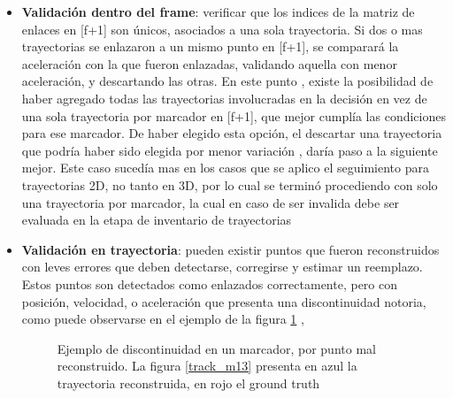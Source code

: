 \begin{itemize}
\item \textbf{Validación dentro del frame}: verificar que los indices de la matriz de enlaces en [f+1] son únicos, asociados a una sola trayectoria. Si dos o mas trayectorias se enlazaron a un mismo punto en [f+1], se comparará la aceleración con la que fueron enlazadas, validando aquella con menor aceleración, y descartando las otras. En este punto , existe la posibilidad de haber agregado todas las trayectorias involucradas en la decisión en vez de una sola trayectoria por marcador en [f+1], que mejor cumplía las condiciones para ese marcador. De haber elegido esta opción, el descartar una trayectoria que podría haber sido elegida por menor variación , daría paso a la siguiente mejor. Este caso sucedía mas en los casos que se aplico el seguimiento para trayectorias 2D, no tanto en 3D, por lo cual se terminó procediendo con solo una trayectoria por marcador, la cual en caso de ser invalida debe ser evaluada en la etapa de inventario de trayectorias  
\item \textbf{Validación en trayectoria}: pueden existir puntos que fueron reconstruidos con leves errores que deben detectarse, corregirse y estimar un reemplazo. Estos puntos son detectados como enlazados correctamente, pero con posición, velocidad, o aceleración que presenta una discontinuidad notoria, como puede observarse en el ejemplo de la figura \ref{discontinuidad_tracking} ,

\begin{figure}[H]
 \centering
 \caption{Ejemplo de discontinuidad en un marcador, por punto mal reconstruido. La figura \ref{track_m13} presenta en azul la trayectoria reconstruida, en rojo el ground truth}
 \label{discontinuidad_tracking}
\end{figure}


\end{itemize}
